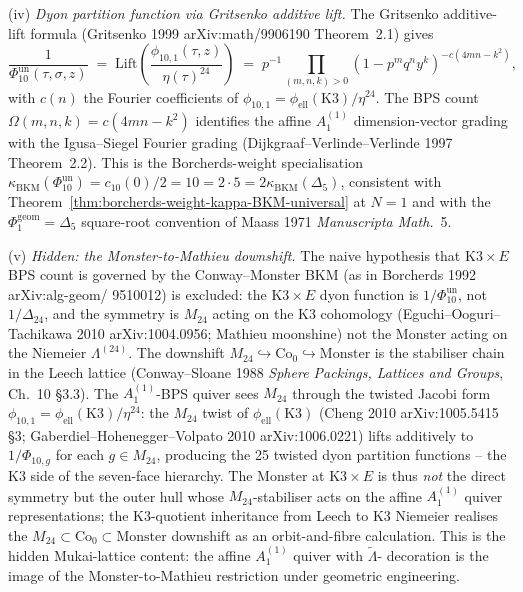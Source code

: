 \begin{remark}
\textup{(iv)} \emph{Dyon partition function via Gritsenko additive
lift.} The Gritsenko additive-lift formula (Gritsenko 1999
arXiv:math/9906190 Theorem~2.1) gives
\[
\frac{1}{\Phi_{10}^{\mathrm{un}}(\tau,\sigma,z)}
 \;=\; \mathrm{Lift}\!\left(\frac{\phi_{10,1}(\tau,z)}{\eta(\tau)^{24}}\right)
 \;=\; p^{-1}\prod_{(m,n,k)>0}(1-p^m q^n y^k)^{-c(4mn-k^2)},
\]
with $c(n)$ the Fourier coefficients of
$\phi_{10,1}=\phi_{\mathrm{ell}}(\mathrm K3)/\eta^{24}$. The BPS
count $\Omega(m,n,k)=c(4mn-k^2)$ identifies the affine $A_1^{(1)}$
dimension-vector grading with the Igusa--Siegel Fourier grading
(Dijkgraaf--Verlinde--Verlinde 1997 Theorem~2.2). This is the
Borcherds-weight specialisation
$\kappa_{\mathrm{BKM}}(\Phi_{10}^{\mathrm{un}})=c_{10}(0)/2=10=2\cdot 5
=2\kappa_{\mathrm{BKM}}(\Delta_5)$, consistent with
\cite{VolI}
Theorem~\ref{thm:borcherds-weight-kappa-BKM-universal} at $N=1$
and with the $\Phi_1^{\mathrm{geom}}=\Delta_5$ square-root convention
of Maass 1971 \emph{Manuscripta Math.}~5.

\textup{(v)} \emph{Hidden: the Monster-to-Mathieu downshift.} The
naive hypothesis that $\mathrm{K3}\times E$ BPS count is governed
by the Conway--Monster BKM (as in Borcherds 1992 arXiv:alg-geom/
9510012) is excluded: the $\mathrm{K3}\times E$ dyon function is
$1/\Phi_{10}^{\mathrm{un}}$, not $1/\Delta_{24}$, and the symmetry is $M_{24}$
acting on the K3 cohomology (Eguchi--Ooguri--Tachikawa 2010
arXiv:1004.0956; Mathieu moonshine) not the Monster acting on
the Niemeier $\Lambda^{(24)}$. The downshift
$M_{24}\hookrightarrow\mathrm{Co}_0\hookrightarrow\mathrm{Monster}$
is the stabiliser chain in the Leech lattice (Conway--Sloane 1988
\emph{Sphere Packings, Lattices and Groups}, Ch.~10 \S 3.3). The
$A_1^{(1)}$-BPS quiver sees $M_{24}$ through the twisted Jacobi form
$\phi_{10,1}=\phi_{\mathrm{ell}}(\mathrm K3)/\eta^{24}$: the $M_{24}$
twist of $\phi_{\mathrm{ell}}(\mathrm K3)$ (Cheng 2010
arXiv:1005.5415 \S 3; Gaberdiel--Hohenegger--Volpato 2010
arXiv:1006.0221) lifts additively to $1/\Phi_{10,g}$ for each
$g\in M_{24}$, producing the 25 twisted dyon partition functions
-- the K3 side of the seven-face hierarchy. The Monster at
$\mathrm{K3}\times E$ is thus \emph{not} the direct symmetry but
the outer hull whose $M_{24}$-stabiliser acts on the affine
$A_1^{(1)}$ quiver representations; the K3-quotient inheritance
from Leech to K3 Niemeier realises the
$M_{24}\subset\mathrm{Co}_0\subset\mathrm{Monster}$ downshift as an
orbit-and-fibre calculation. This is the hidden Mukai-lattice
content: the affine $A_1^{(1)}$ quiver with $\widetilde\Lambda$-
decoration is the image of the Monster-to-Mathieu restriction under
geometric engineering.
\end{remark}

